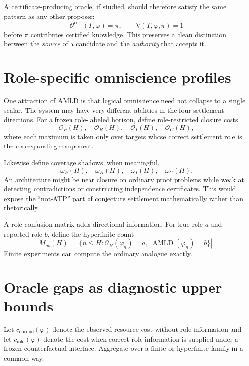 \documentclass[11pt]{article}
\newcommand{\AMLD}{\operatorname{AMLD}}
\newcommand{\V}{\mathrm{V}}
\newcommand{\Ocal}{\mathcal{O}}
\begin{document}
A certificate-producing oracle, if studied, should therefore satisfy the same pattern as any other proposer:
\begin{equation}
\mathscr O^{\mathrm{cert}}(T,\varphi)=\pi,
\qquad
\V(T,\varphi,\pi)=1
\end{equation}
before $\pi$ contributes certified knowledge. This preserves a clean distinction between the \emph{source} of a candidate and the \emph{authority} that accepts it.

\section{Role-specific omniscience profiles}

One attraction of AMLD is that logical omniscience need not collapse to a single scalar. The system may have very different abilities in the four settlement directions. For a frozen role-labeled horizon, define role-restricted closure costs
\begin{equation}
\Ocal_P(H),\quad
\Ocal_R(H),\quad
\Ocal_I(H),\quad
\Ocal_C(H),
\end{equation}
where each maximum is taken only over targets whose correct settlement role is the corresponding component.

Likewise define coverage shadows, when meaningful,
\begin{equation}
\omega_P(H),\quad
\omega_R(H),\quad
\omega_I(H),\quad
\omega_C(H).
\end{equation}
An architecture might be near closure on ordinary proof problems while weak at detecting contradictions or constructing independence certificates. This would expose the ``not-ATP'' part of conjecture settlement mathematically rather than rhetorically.

A role-confusion matrix adds directional information. For true role $a$ and reported role $b$, define the hyperfinite count
\begin{equation}
M_{ab}(H)=
|\{n\le H:\mathscr O_H(\varphi_n)=a,\;\AMLD(\varphi_n)=b\}|.
\end{equation}
Finite experiments can compute the ordinary analogue exactly.

\section{Oracle gaps as diagnostic upper bounds}

Let $c_{\mathrm{normal}}(\varphi)$ denote the observed resource cost without role information and let $c_{\mathrm{role}}(\varphi)$ denote the cost when correct role information is supplied under a frozen counterfactual interface. Aggregate over a finite or hyperfinite family in a common way.
\end{document}
